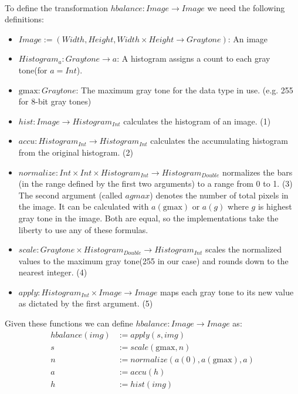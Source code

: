 \documentclass{article}
\newcommand{\gmax}[0]{\textrm{gmax}}
\begin{document}
      \paragraph{}
      To define the transformation $ hbalance: Image \rightarrow Image$ we need the following definitions:
      \begin{itemize}
        \item $Image := (Width,Height,Width \times Height \rightarrow Graytone)$:
          An image
        \item $Histogram_a: Graytone \rightarrow a$:
          A histogram assigns a count to each gray tone(for $a=Int$).
        \item $\gmax: Graytone$:
          The maximum gray tone for the data type in use. (e.g. 255 for 8-bit gray tones)
        \item $hist: Image \rightarrow Histogram_{Int}$
          calculates the histogram of an image. (1)
        \item $accu: Histogram_{Int} \rightarrow Histogram_{Int}$
          calculates the accumulating histogram from the original histogram. (2)
        \item $normalize: Int \times Int \times Histogram_{Int} \rightarrow Histogram_{Double}$
          normalizes the bars (in the range defined by the first two arguments) to a range from 0 to 1. (3)
          The second argument (called $agmax$) denotes the number of total pixels in the image.
          It can be calculated with $a(\gmax)$ or $a(g)$ where $g$ is highest gray tone in the image.
          Both are equal, so the implementations take the liberty to use any of these formulas.
        \item $scale: Graytone \times Histogram_{Double} \rightarrow Histogram_{Int}$
          scales the normalized values to the maximum gray tone(255 in our case) and rounds down to the nearest integer. (4)
        \item $apply: Histogram_{Int} \times Image \rightarrow Image$
          maps each gray tone to its new value as dictated by the first argument. (5)
      \end{itemize}
      
      Given these functions we can define $hbalance: Image \rightarrow Image$ as:
      \begin{equation}
      \begin{split}
        hbalance(img) & := apply(s,img) \\
          s & := scale(\gmax,n) \\
          n & := normalize(a(0), a(\gmax), a) \\
          a & := accu(h) \\
          h & := hist(img) \\
      \end{split}
      \end{equation}
      
\end{document}
